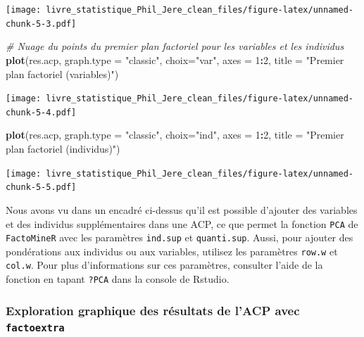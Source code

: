 \documentclass[
  11pt,
  french,
]{book}
\makeatletter
\newenvironment{Shaded}{\begin{snugshade}}{\end{snugshade}}
\newcommand{\CommentTok}[1]{\textcolor[rgb]{0.56,0.35,0.01}{\textit{#1}}}
\newcommand{\DataTypeTok}[1]{\textcolor[rgb]{0.13,0.29,0.53}{#1}}
\newcommand{\DecValTok}[1]{\textcolor[rgb]{0.00,0.00,0.81}{#1}}
\newcommand{\KeywordTok}[1]{\textcolor[rgb]{0.13,0.29,0.53}{\textbf{#1}}}
\newcommand{\NormalTok}[1]{#1}
\newcommand{\OperatorTok}[1]{\textcolor[rgb]{0.81,0.36,0.00}{\textbf{#1}}}
\newcommand{\StringTok}[1]{\textcolor[rgb]{0.31,0.60,0.02}{#1}}
\newenvironment{kframe}{%
\medskip{}
\setlength{\fboxsep}{.8em}
 \def\at@end@of@kframe{}%
 \ifinner\ifhmode%
  \def\at@end@of@kframe{\end{minipage}}%
  \begin{minipage}{\columnwidth}%
 \fi\fi%
 \def\FrameCommand##1{\hskip\@totalleftmargin \hskip-\fboxsep
 \colorbox{shadecolor}{##1}\hskip-\fboxsep
     \hskip-\linewidth \hskip-\@totalleftmargin \hskip\columnwidth}%
 \MakeFramed {\advance\hsize-\width
   \@totalleftmargin\z@ \linewidth\hsize
   \@setminipage}}%
 {\par\unskip\endMakeFramed%
 \at@end@of@kframe}
\newenvironment{kframev}{%
\medskip{}
\setlength{\fboxsep}{.8em}
 \def\at@end@of@kframev{}%
 \ifinner\ifhmode%
  \def\at@end@of@kframev{\end{minipage}}%
  \begin{minipage}{\columnwidth}%
 \fi\fi%
 \def\FrameCommand##1{\hskip\@totalleftmargin \hskip-\fboxsep
 \colorbox{shadebluecolor}{##1}\hskip-\fboxsep
     \hskip-\linewidth \hskip-\@totalleftmargin \hskip\columnwidth}%
 \MakeFramed {\advance\hsize-\width
   \@totalleftmargin\z@ \linewidth\hsize
   \@setminipage}}%
 {\par\unskip\endMakeFramed%
 \at@end@of@kframev}
\renewenvironment{Shaded}{\begin{kframe}}{\end{kframe}}
\newenvironment{rmdblock}[1]
  {
  \begin{itemize}
  \renewcommand{\labelitemi}{
    \raisebox{-.7\height}[0pt][0pt]{
      {\setkeys{Gin}{width=3em,keepaspectratio}\texttt{[image: images/\#1]}}
    }
  }
  \setlength{\fboxsep}{1em}
  \begin{kframev}
  \small
  \item
  }
  {
  \end{kframev}
  \end{itemize}
  }
\newenvironment{bloc_aller_loin}
  {\begin{rmdblock}{aller_loin}}
  {\end{rmdblock}}
\makeatother
\begin{document}
\texttt{[image: livre\_statistique\_Phil\_Jere\_clean\_files/figure-latex/unnamed-chunk-5-3.pdf]}

\begin{Shaded}
\begin{Highlighting}[]
\CommentTok{# Nuage du points du premier plan factoriel pour les variables et les individus}
\KeywordTok{plot}\NormalTok{(res.acp, }\DataTypeTok{graph.type =} \StringTok{"classic"}\NormalTok{, }\DataTypeTok{choix=}\StringTok{"var"}\NormalTok{, }\DataTypeTok{axes =} \DecValTok{1}\OperatorTok{:}\DecValTok{2}\NormalTok{, }
     \DataTypeTok{title =} \StringTok{"Premier plan factoriel (variables)"}\NormalTok{)}
\end{Highlighting}
\end{Shaded}

\texttt{[image: livre\_statistique\_Phil\_Jere\_clean\_files/figure-latex/unnamed-chunk-5-4.pdf]}

\begin{Shaded}
\begin{Highlighting}[]
\KeywordTok{plot}\NormalTok{(res.acp, }\DataTypeTok{graph.type =} \StringTok{"classic"}\NormalTok{, }\DataTypeTok{choix=}\StringTok{"ind"}\NormalTok{, }\DataTypeTok{axes =} \DecValTok{1}\OperatorTok{:}\DecValTok{2}\NormalTok{, }
     \DataTypeTok{title =} \StringTok{"Premier plan factoriel (individus)"}\NormalTok{)}
\end{Highlighting}
\end{Shaded}

\texttt{[image: livre\_statistique\_Phil\_Jere\_clean\_files/figure-latex/unnamed-chunk-5-5.pdf]}

\begin{bloc_aller_loin}
Nous avons vu dans un encadré ci-dessus qu'il est possible d'ajouter des variables et des individus supplémentaires dans une ACP, ce que permet la fonction \texttt{PCA} de \texttt{FactoMineR} avec les paramètres \texttt{ind.sup} et \texttt{quanti.sup}. Aussi, pour ajouter des pondérations aux individus ou aux variables, utilisez les paramètres \texttt{row.w} et \texttt{col.w}. Pour plus d'informations sur ces paramètres, consulter l'aide de la fonction en tapant \texttt{?PCA} dans la console de Rstudio.

\end{bloc_aller_loin}

\hypertarget{sect12232}{%
\subsubsection{\texorpdfstring{Exploration graphique des résultats de l'ACP avec \texttt{factoextra}}{Exploration graphique des résultats de l'ACP avec factoextra}}\label{sect12232}}
\end{document}
